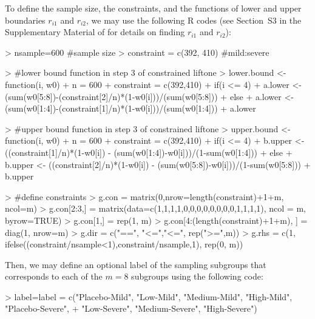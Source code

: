 To define the sample size, the constraints, and the functions of lower and upper boundaries $r_{i1}$ and $r_{i2}$, we may use the following R codes (see Section~S3 in the Supplementary Material of \cite{huang2023constrained} for details on finding $r_{i1}$ and $r_{i2}$):
\begin{example}
> nsample=600 #sample size
> constraint = c(392, 410)  #mild:severe

> #lower bound function in step 3 of constrained liftone
> lower.bound <- function(i, w0){
+   n = 600
+   constraint = c(392,410)
+   if(i <= 4){
+     a.lower <- (sum(w0[5:8])-(constraint[2]/n)*(1-w0[i]))/(sum(w0[5:8]))}
+   else{
+     a.lower <- (sum(w0[1:4])-(constraint[1]/n)*(1-w0[i]))/(sum(w0[1:4]))}
+    a.lower}

> #upper bound function in step 3 of constrained liftone
> upper.bound <- function(i, w0){
+  n = 600
+  constraint = c(392,410)
+  if(i <= 4){
+    b.upper <- ((constraint[1]/n)*(1-w0[i]) - (sum(w0[1:4])-w0[i]))/(1-sum(w0[1:4]))}
+  else{
+    b.upper <- ((constraint[2]/n)*(1-w0[i]) - (sum(w0[5:8])-w0[i]))/(1-sum(w0[5:8]))}
+    b.upper}

> #define constraints
> g.con = matrix(0,nrow=length(constraint)+1+m, ncol=m)
> g.con[2:3,] = matrix(data=c(1,1,1,1,0,0,0,0,0,0,0,0,1,1,1,1), ncol = m, byrow=TRUE)
> g.con[1,] = rep(1, m)
> g.con[4:(length(constraint)+1+m), ] = diag(1, nrow=m)
> g.dir = c("==", "<=","<=", rep(">=",m))
> g.rhs = c(1, ifelse((constraint/nsample<1),constraint/nsample,1), rep(0, m))
\end{example}

Then, we may define an optional label of the sampling subgroups that corresponds to each of the $m=8$ subgroups using the following code:

\begin{example}
> label=label = c("Placebo-Mild", "Low-Mild", "Medium-Mild", "High-Mild", "Placebo-Severe",
+ "Low-Severe", "Medium-Severe", "High-Severe")
\end{example}


